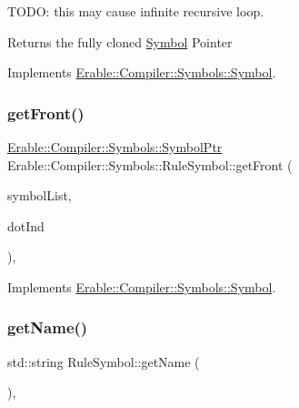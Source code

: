 T\+O\+DO\+: this may cause infinite recursive loop. \begin{DoxyReturn}{Returns}
the fully cloned \mbox{\hyperlink{class_erable_1_1_compiler_1_1_symbols_1_1_symbol}{Symbol}} Pointer 
\end{DoxyReturn}


Implements \mbox{\hyperlink{class_erable_1_1_compiler_1_1_symbols_1_1_symbol_a23ed5c4b948000c29af03c846abc12fc}{Erable\+::\+Compiler\+::\+Symbols\+::\+Symbol}}.

\mbox{\label{class_erable_1_1_compiler_1_1_symbols_1_1_rule_symbol_a484f836b4e62840e86bf99143f11c3e0}} 
\subsubsection{\texorpdfstring{getFront()}{getFront()}}
{\footnotesize\ttfamily \mbox{\hyperlink{namespace_erable_1_1_compiler_1_1_symbols_a8f0bc762f448ea4d84e8713ab3e140b9}{Erable\+::\+Compiler\+::\+Symbols\+::\+Symbol\+Ptr}} Erable\+::\+Compiler\+::\+Symbols\+::\+Rule\+Symbol\+::get\+Front (\begin{DoxyParamCaption}\item[{\mbox{\hyperlink{namespace_erable_1_1_compiler_1_1_symbols_a63e8157d2f729d4689d27bacad42f8ed}{Symbol\+List}} \&}]{symbol\+List,  }\item[{int}]{dot\+Ind }\end{DoxyParamCaption})\hspace{0.3cm}{\ttfamily [override]}, {\ttfamily [virtual]}}



Implements \mbox{\hyperlink{class_erable_1_1_compiler_1_1_symbols_1_1_symbol_ad9df550a90d6821b73291a241044c163}{Erable\+::\+Compiler\+::\+Symbols\+::\+Symbol}}.

\mbox{\label{class_erable_1_1_compiler_1_1_symbols_1_1_rule_symbol_a5f6cb5a2fc49bc62cc61035cc99464ca}} 
\subsubsection{\texorpdfstring{getName()}{getName()}}
{\footnotesize\ttfamily std\+::string Rule\+Symbol\+::get\+Name (\begin{DoxyParamCaption}{ }\end{DoxyParamCaption})\hspace{0.3cm}{\ttfamily [override]}, {\ttfamily [virtual]}}



